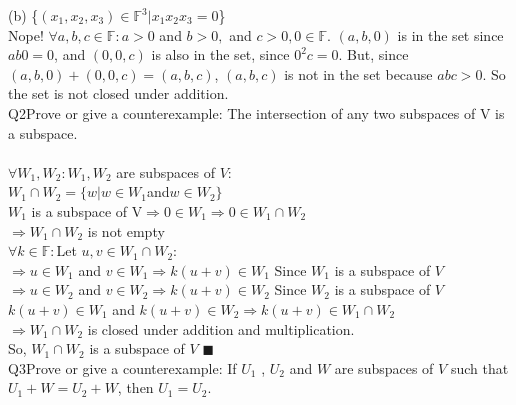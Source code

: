 \documentclass{article}
\begin{document}
(b) \{$(x_1,x_2,x_3)\in \mathbb{F}^3| x_1x_2x_3 = 0$\}\\

Nope! $\forall a,b,c \in \mathbb{F}: a > 0 $ and $ b > 0, $ and $ c >
0, 0 \in \mathbb{F}$.
$(a,b,0)$ is in the set since $ab0=0$, and $(0,0,c)$ is also in
the set, since $0^2c=0$. But, since $(a,b,0) + (0,0,c) = (a,b,c)$,
$(a,b,c)$ is not in the set because $abc > 0$. So the set is not
closed under addition.\\

\newpage
Q2\quad Prove or give a counterexample:
The intersection of any two subspaces of V is a subspace.\\

\\
$\forall W_1,W_2: W_1,W_2$ are subspaces of $V$:\\
$W_1 \cap W_2 = \{w | w \in W_1$and$ w\in W_2\}$\\

$W_1$ is a subspace of V$ \Rightarrow 0 \in W_1 \Rightarrow
0 \in W_1 \cap W_2$\\
$\Rightarrow W_1 \cap W_2$ is not empty\\

$\forall k \in \mathbb{F}: $Let $u,v \in W_1 \cap W_2$:\\
$\Rightarrow u \in W_1$ and $ v \in W_1 \Rightarrow k(u+v) \in W_1$ Since
$W_1$ is a subspace of $V$\\
$\Rightarrow u \in W_2$ and $ v \in W_2 \Rightarrow k(u+v) \in W_2$ Since
$W_2$ is a subspace of $V$\\
$k(u+v) \in W_1$ and $k(u+v) \in W_2 \Rightarrow k(u+v) \in W_1 \cap
W_2$\\
$\Rightarrow W_1 \cap W_2$ is closed under addition and multiplication.\\
So, $W_1 \cap W_2$ is a subspace of $V$ $\blacksquare$\\

Q3\quad Prove or give a counterexample: If $U_1$ , $U_2$ and $W$ are subspaces
of $V$ such that $U_1 + W = U_2 + W$, then $U_1 = U_2$.\\
\end{document}
